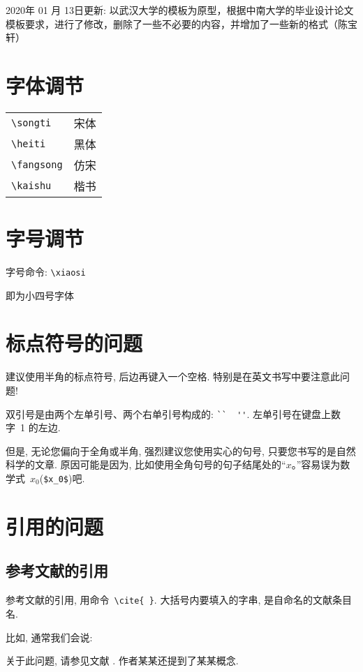 \documentclass[forprint]{CSUBachelor}
\begin{document}
2020年 01 月 13日更新: 以武汉大学的模板为原型，根据中南大学的毕业设计论文模板要求，进行了修改，删除了一些不必要的内容，并增加了一些新的格式（陈宝轩）

\section{字体调节}

\begin{tabular}{ll}
	\verb|\songti|   & {\songti 宋体}   \\
	\verb|\heiti|    & {\heiti 黑体}    \\
	\verb|\fangsong| & {\fangsong 仿宋} \\
	\verb|\kaishu|   & {\kaishu 楷书}
\end{tabular}


\section{字号调节}
字号命令: \verb|\xiaosi| 

即为小四号字体

\section{标点符号的问题}

建议使用半角的标点符号, 后边再键入一个空格. 特别是在英文书写中要注意此问题!

双引号是由两个左单引号、两个右单引号构成的: \verb|``  ''|. 左单引号在键盘上数字~1 的左边.

但是, 无论您偏向于全角或半角, 强烈建议您使用实心的句号, 只要您书写的是自然科学的文章.
原因可能是因为, 比如使用全角句号的句子结尾处的``$x$。''容易误为数学式~$x_0$(\verb|$x_0$|)吧.


\section{引用的问题}


\subsection{参考文献的引用}

参考文献的引用, 用命令~\verb|\cite{ }|. 大括号内要填入的字串, 是自命名的文献条目名.

比如, 通常我们会说:

 {\kaishu
关于此问题, 请参见文献 \cite{r2}. 作者某某还提到了某某概念.}
\end{document}
